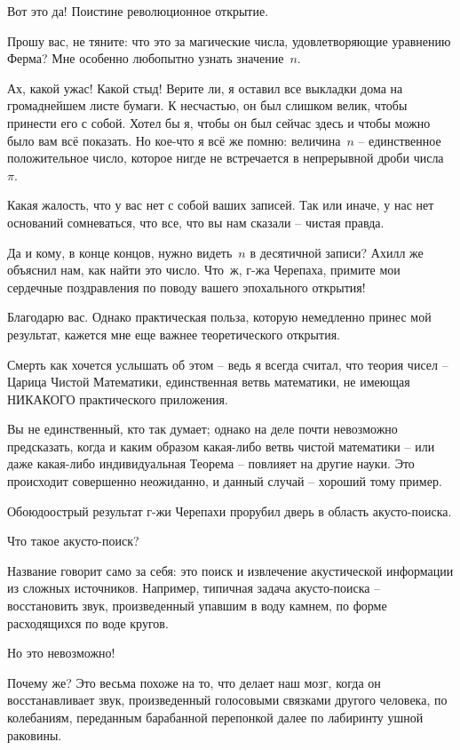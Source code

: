 \documentclass[../main.tex]{subfiles}
\begin{document}
\begin{dialogue}
 Вот это да! Поистине революционное открытие.

 Прошу вас, не тяните: что это за магические числа, удовлетворяющие уравнению Ферма? Мне особенно любопытно узнать значение~$n$.

 Ах, какой ужас! Какой стыд! Верите ли, я оставил все выкладки дома на громаднейшем листе бумаги. К несчастью, он был слишком велик, чтобы принести его с собой. Хотел бы я, чтобы он был сейчас здесь и чтобы можно было вам всё показать. Но кое-что я всё же помню: величина~$n$ \--- единственное положительное число, которое нигде не встречается в непрерывной дроби числа~$\pi$.

 Какая жалость, что у вас нет с собой ваших записей. Так или иначе, у нас нет оснований сомневаться, что все, что вы нам сказали \--- чистая правда.

 Да и кому, в конце концов, нужно видеть~$n$ в десятичной записи? Ахилл же объяснил нам, как найти это число. Что~ж, г-жа Черепаха, примите мои сердечные поздравления по поводу вашего эпохального открытия!

 Благодарю вас. Однако практическая польза, которую немедленно принес мой результат, кажется мне еще важнее теоретического открытия.

 Смерть как хочется услышать об этом \--- ведь я всегда считал, что теория чисел \--- Царица Чистой Математики, единственная ветвь математики, не имеющая НИКАКОГО практического приложения.

 Вы не единственный, кто так думает; однако на деле почти невозможно предсказать, когда и каким образом какая-либо ветвь чистой математики \--- или даже какая-либо индивидуальная Теорема \--- повлияет на другие науки. Это происходит совершенно неожиданно, и данный случай \--- хороший тому пример.

 Обоюдоострый результат г-жи Черепахи прорубил дверь в область акусто-поиска.

 Что такое акусто-поиск?

 Название говорит само за себя: это поиск и извлечение акустической информации из сложных источников. Например, типичная задача акусто-поиска \--- восстановить звук, произведенный упавшим в воду камнем, по форме расходящихся по воде кругов.

 Но это невозможно!

 Почему же? Это весьма похоже на то, что делает наш мозг, когда он восстанавливает звук, произведенный голосовыми связками другого человека, по колебаниям, переданным барабанной перепонкой далее по лабиринту ушной раковины.


\end{dialogue}
\end{document}
